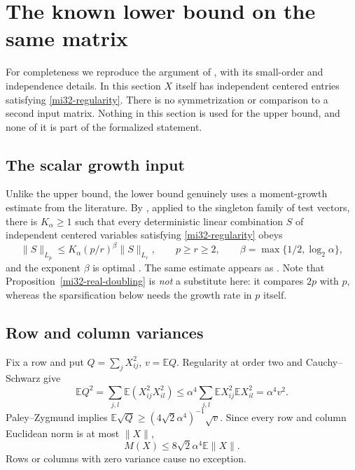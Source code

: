 \documentclass[11pt]{article}
\theoremstyle{definition}
\theoremstyle{remark}
\newcommand{\E}{\mathbb E}
\newcommand{\norm}[1]{\lVert#1\rVert}
\begin{document}
\section{The known lower bound on the same matrix}
\label{mi32-lower-section}

For completeness we reproduce the argument of
\cite[Theorem~4.1 and Lemma~4.2]{LatalaSwiatkowski}, with its
small-order and independence details. In this section $X$ itself
has independent centered entries satisfying \eqref{mi32-regularity}.
There is no symmetrization or comparison to a second input matrix.
Nothing in this section is used for the upper bound, and none of it is
part of the formalized statement.

\subsection{The scalar growth input}

Unlike the upper bound, the lower bound genuinely uses a moment-growth
estimate from the literature. By
\cite[Corollary~1.4]{LatalaStrzelecka}, applied to the singleton family
of test vectors, there is $K_\alpha\ge1$ such that every deterministic
linear combination $S$ of independent centered variables satisfying
\eqref{mi32-regularity} obeys
\begin{equation}\label{mi32-lower-scalar-growth}
 \norm{S}_{L_p}\le K_\alpha(p/r)^\beta\norm{S}_{L_r},
 \qquad p\ge r\ge2,
 \qquad \beta=\max\{1/2,\log_2\alpha\},
\end{equation}
and the exponent $\beta$ is optimal
\cite[Remark~1.5]{LatalaStrzelecka}. The same estimate appears as
\cite[(27)]{LatalaSwiatkowski}. Note that
Proposition~\ref{mi32-real-doubling} is \emph{not} a substitute here:
it compares $2p$ with $p$, whereas the sparsification below needs the
growth rate in $p$ itself.

\subsection{Row and column variances}

Fix a row and put $Q=\sum_jX_{ij}^2$, $v=\E Q$.
Regularity at order two and Cauchy--Schwarz give
\[
 \E Q^2=\sum_{j,l}\E(X_{ij}^2X_{il}^2)
 \le\alpha^4\sum_{j,l}\E X_{ij}^2\E X_{il}^2
 =\alpha^4v^2.
\]
Paley--Zygmund implies
$\E\sqrt Q\ge(4\sqrt2\alpha^4)^{-1}\sqrt v$.
Since every row and column Euclidean norm is at most $\norm{X}$,
\begin{equation}\label{mi32-lower-variance}
 M(X)\le8\sqrt2\alpha^4\E\norm{X}.
\end{equation}
Rows or columns with zero variance cause no exception.
\end{document}
